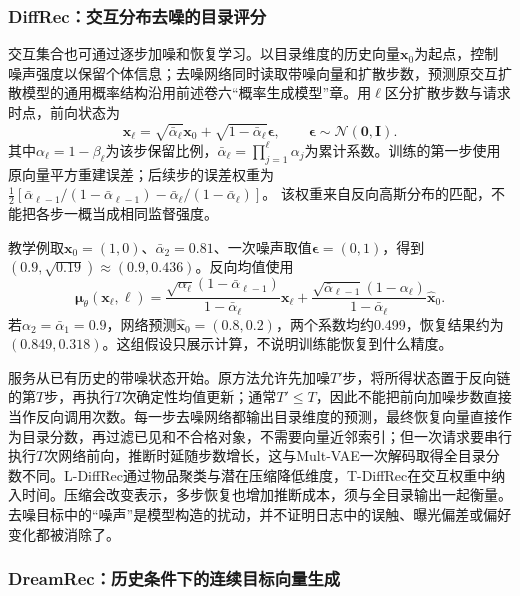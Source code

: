 \subsubsection{DiffRec：交互分布去噪的目录评分}
\label{sec:rs-diffrec}

交互集合也可通过逐步加噪和恢复学习。以目录维度的历史向量$\bm x_0$为起点，控制噪声强度以保留个体信息；去噪网络同时读取带噪向量和扩散步数，预测原交互扩散模型的通用概率结构沿用前述卷六“概率生成模型”章。用$\ell$区分扩散步数与请求时点，前向状态为
\begin{equation}
 \bm x_\ell=\sqrt{\bar\alpha_\ell}\bm x_0+
       \sqrt{1-\bar\alpha_\ell}\bm\epsilon,\qquad
 \bm\epsilon\sim\mathcal N(\bm0,\bm I).
 \label{eq:rs-diffrec-noise}
\end{equation}
其中$\alpha_\ell=1-\beta_\ell$为该步保留比例，$\bar\alpha_\ell=\prod_{j=1}^\ell\alpha_j$为累计系数。训练的第一步使用原向量平方重建误差；后续步的误差权重为
$\tfrac12[\bar\alpha_{\ell-1}/(1-\bar\alpha_{\ell-1})-\bar\alpha_\ell/(1-\bar\alpha_\ell)]$。
该权重来自反向高斯分布的匹配，不能把各步一概当成相同监督强度。

教学例取$\bm x_0=(1,0)$、$\bar\alpha_2=0.81$、一次噪声取值$\bm\epsilon=(0,1)$，得到$(0.9,\sqrt{0.19})\approx(0.9,0.436)$。反向均值使用
\begin{equation}
 \bm\mu_\theta(\bm x_\ell,\ell)=
 \frac{\sqrt{\alpha_\ell}(1-\bar\alpha_{\ell-1})}{1-\bar\alpha_\ell}\bm x_\ell
 +\frac{\sqrt{\bar\alpha_{\ell-1}}(1-\alpha_\ell)}{1-\bar\alpha_\ell}
       \widehat{\bm x}_0.
 \label{eq:rs-diffrec-mean}
\end{equation}
若$\alpha_2=\bar\alpha_1=0.9$，网络预测$\widehat{\bm x}_0=(0.8,0.2)$，两个系数均约0.499，恢复结果约为$(0.849,0.318)$。这组假设只展示计算，不说明训练能恢复到什么精度。

服务从已有历史的带噪状态开始。原方法允许先加噪$T'$步，将所得状态置于反向链的第$T$步，再执行$T$次确定性均值更新；通常$T'\le T$，因此不能把前向加噪步数直接当作反向调用次数。每一步去噪网络都输出目录维度的预测，最终恢复向量直接作为目录分数，再过滤已见和不合格对象，不需要向量近邻索引；但一次请求要串行执行$T$次网络前向，推断时延随步数增长，这与Mult-VAE一次解码取得全目录分数不同。L-DiffRec通过物品聚类与潜在压缩降低维度，T-DiffRec在交互权重中纳入时间。压缩会改变表示，多步恢复也增加推断成本，须与全目录输出一起衡量。去噪目标中的“噪声”是模型构造的扰动，并不证明日志中的误触、曝光偏差或偏好变化都被消除了。

\Needspace{90mm}
\subsubsection{DreamRec：历史条件下的连续目标向量生成}
\label{sec:rs-dreamrec}

